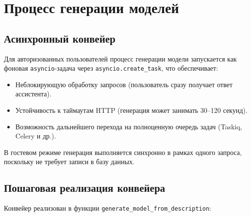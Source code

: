 \section{Процесс генерации моделей}

\subsection{Асинхронный конвейер}

Для авторизованных пользователей процесс генерации модели запускается как фоновая \texttt{asyncio}-задача через \texttt{asyncio.create\_task}, что обеспечивает:

\begin{itemize}
    \item Неблокирующую обработку запросов (пользователь сразу получает ответ ассистента).
    \item Устойчивость к таймаутам HTTP (генерация может занимать 30--120 секунд).
    \item Возможность дальнейшего перехода на полноценную очередь задач (Taskiq, Celery и др.).
\end{itemize}

В гостевом режиме генерация выполняется синхронно в рамках одного запроса, поскольку не требует записи в базу данных.

\subsection{Пошаговая реализация конвейера}

Конвейер реализован в функции \texttt{generate\_model\_from\_description}:

